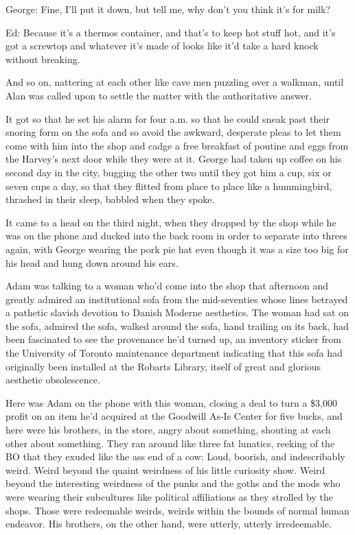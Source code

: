 \documentclass{article}
\begin{document}
George:  Fine, I'll put it down, but tell me, why don't you think it's
for milk?

Ed:  Because it's a thermos container, and that's to keep hot stuff
hot, and it's got a screwtop and whatever it's made of looks like it'd
take a hard knock without breaking.

And so on, nattering at each other like cave men puzzling over a
walkman, until Alan was called upon to settle the matter with the
authoritative answer.

It got so that he set his alarm for four a.m.  so that he could sneak
past their snoring form on the sofa and so avoid the awkward,
desperate pleas to let them come with him into the shop and cadge a
free breakfast of poutine and eggs from the Harvey's next door while
they were at it.  George had taken up coffee on his second day in the
city, bugging the other two until they got him a cup, six or seven
cups a day, so that they flitted from place to place like a
hummingbird, thrashed in their sleep, babbled when they spoke.

It came to a head on the third night, when they dropped by the shop
while he was on the phone and ducked into the back room in order to
separate into threes again, with George wearing the pork pie hat even
though it was a size too big for his head and hung down around his
ears.

Adam was talking to a woman who'd come into the shop that afternoon
and greatly admired an institutional sofa from the mid-seventies whose
lines betrayed a pathetic slavish devotion to Danish Moderne
aesthetics.  The woman had sat on the sofa, admired the sofa, walked
around the sofa, hand trailing on its back, had been fascinated to see
the provenance he'd turned up, an inventory sticker from the
University of Toronto maintenance department indicating that this sofa
had originally been installed at the Robarts Library, itself of great
and glorious aesthetic obsolescence.

Here was Adam on the phone with this woman, closing a deal to turn a
\$3,000 profit on an item he'd acquired at the Goodwill As-Is Center
for five bucks, and here were his brothers, in the store, angry about
something, shouting at each other about something.  They ran around
like three fat lunatics, reeking of the BO that they exuded like the
ass end of a cow:  Loud, boorish, and indescribably weird.  Weird
beyond the quaint weirdness of his little curiosity show.  Weird
beyond the interesting weirdness of the punks and the goths and the
mods who were wearing their subcultures like political affiliations as
they strolled by the shops.  Those were redeemable weirds, weirds
within the bounds of normal human endeavor.  His brothers, on the
other hand, were utterly, utterly irredeemable.
\end{document}
